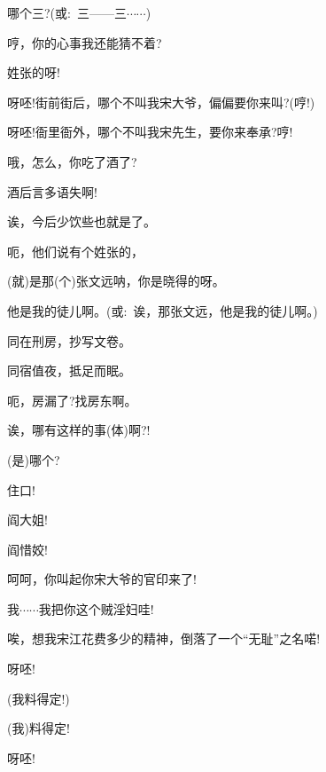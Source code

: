 {{哪个三?({\akai 或}:~三------三$\cdots{}\cdots{}$)}

{哼，你的心事我还能猜不着?}

{姓张的呀!}

{呀呸!街前街后，哪个不叫我宋大爷，偏偏要你来叫?(哼!)}

{呀呸!衙里衙外，哪个不叫我宋先生，要你来奉承?哼!}

{哦，怎么，你吃了酒了?}

{酒后言多语失啊!}

{诶，今后少饮些也就是了。}

{呃，他们说有个姓张的，}

{(就)是那(个)张文远呐，你是晓得的呀。}

{他是我的徒儿啊。({\akai 或}:~诶，那张文远，他是我的徒儿啊。)}

{同在刑房，抄写文卷。}

{同宿值夜，抵足而眠。}

{呃，房漏了?找房东啊。}

{诶，哪有这样的事(体)啊?!}

{(是)哪个?}

{住口!}


{阎大姐!}

{阎惜姣!}

{呵呵，你叫起你宋大爷的官印来了!}

{我$\cdots{}\cdots{}$我把你这个贼淫妇哇!}

{唉，想我宋江花费多少的精神，倒落了一个``无耻''之名喏!}


{呀呸!}



{(我料得定!)}

{(我)料得定!}

{呀呸!}


}
